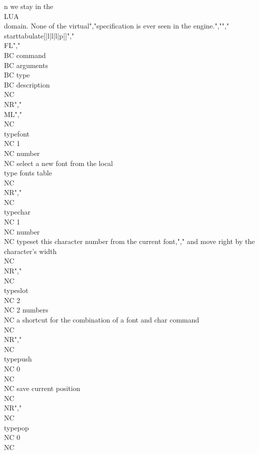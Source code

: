 n we stay in the \\LUA\\ domain. None of the virtual","specification is ever seen in the engine.","","\\starttabulate[|l|l|l|p|]","\\FL","\\BC command          \\BC arguments \\BC type      \\BC description \\NC \\NR","\\ML","\\NC \\type{font}      \\NC 1         \\NC number    \\NC select a new font from the local \\type {fonts} table \\NC \\NR","\\NC \\type{char}      \\NC 1         \\NC number    \\NC typeset this character number from the current font,","                                                     and move right by the character's width \\NC \\NR","\\NC \\type{slot}      \\NC 2         \\NC 2 numbers \\NC a shortcut for the combination of a font and char command\\NC \\NR","\\NC \\type{push}      \\NC 0         \\NC           \\NC save current position\\NC \\NR","\\NC \\type{pop}       \\NC 0         \\NC        